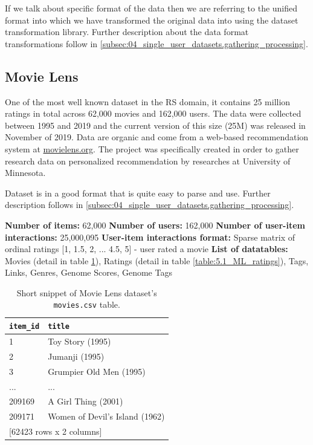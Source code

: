 If we talk about specific format of the data then we are referring to the unified format into which we have transformed the original data into using the dataset transformation library. Further description about the data format transformations follow in \ref{subsec:04_single_user_datasets.gathering_processing}.



\subsection{Movie Lens}
One of the most well known dataset in the RS domain, it contains 25 million ratings in total across 62,000 movies and 162,000 users. The data were collected between 1995 and 2019 and the current version of this size (25M) was released in November of 2019. Data are organic and come from a web-based recommendation system at \href{https://movielens.org/}{movielens.org}. The project was specifically created in order to gather research data on personalized recommendation by researches at University of Minnesota.

Dataset is in a good format that is quite easy to parse and use. Further description follows in \ref{subsec:04_single_user_datasets.gathering_processing}.

\hfill \break
\noindent
\textbf{Number of items:} 62,000 \newline
\textbf{Number of users:} 162,000 \newline
\textbf{Number of user-item interactions:} 25,000,095 \newline
\textbf{User-item interactions format:} Sparse matrix of ordinal ratings [1, 1.5, 2, ... 4.5, 5] - user rated a movie \newline
\textbf{List of datatables:} Movies (detail in table \ref{table:5.1_ML_movies}), Ratings (detail in table \ref{table:5.1_ML_ratings}), Tags, Links, Genres, Genome Scores, Genome Tags

\begin{table}[ht!]
\centering
\begin{tabular}{ l l }
\verb|item_id| & \verb|title| \\
    \hline
     1  &                   Toy Story (1995) \\
     2  &                     Jumanji (1995) \\
     3  &            Grumpier Old Men (1995) \\
   ...  &                                ... \\
209169  &                A Girl Thing (2001) \\
209171  &     Women of Devil's Island (1962) \\ [1mm]
\multicolumn{2}{l}{{[62423 rows x 2 columns]}}
\end{tabular}
\caption{Short snippet of Movie Lens dataset's \texttt{movies.csv} table.}
\label{table:5.1_ML_movies}
\end{table}


